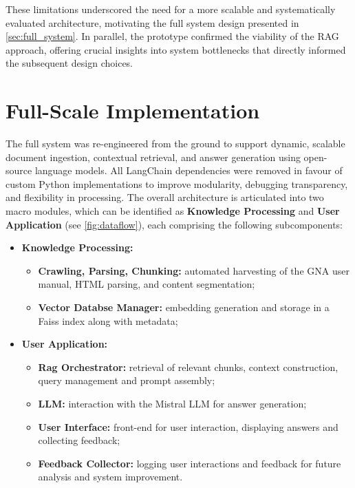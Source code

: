 \begin{spacing}{1.5}
These limitations underscored the need for a more scalable and systematically evaluated architecture, motivating the full system design presented in \autoref{sec:full_system}. In parallel, the prototype confirmed the viability of the RAG approach, offering crucial insights into system bottlenecks that directly informed the subsequent design choices.


\section{Full-Scale Implementation}\label{sec:full_system}
The full system was re-engineered from the ground to support dynamic, scalable document ingestion, contextual retrieval, and answer generation using open-source language models. All LangChain dependencies were removed in favour of custom Python implementations to improve modularity, debugging transparency, and flexibility in processing. The overall architecture is articulated into two macro modules, which can be identified as \textbf{Knowledge Processing} and \textbf{User Application} (see \autoref{fig:dataflow}), each comprising the following subcomponents:
\begin{itemize}
      \item \textbf{Knowledge Processing:}
      \begin{itemize}
        \item \textbf{Crawling, Parsing, Chunking:} automated harvesting of the GNA user manual, HTML parsing, and content segmentation;
        \item \textbf{Vector Databse Manager:} embedding generation and storage in a Faiss index along with metadata;
      \end{itemize}
      \item \textbf{User Application:}
      \begin{itemize}
        \item \textbf{Rag Orchestrator:} retrieval of relevant chunks, context construction, query management and prompt assembly;
        \item \textbf{LLM:} interaction with the Mistral LLM for answer generation;
        \item \textbf{User Interface:} front-end for user interaction, displaying answers and collecting feedback;
        \item \textbf{Feedback Collector:} logging user interactions and feedback for future analysis and system improvement.
      \end{itemize}
\end{itemize}


\end{spacing}
